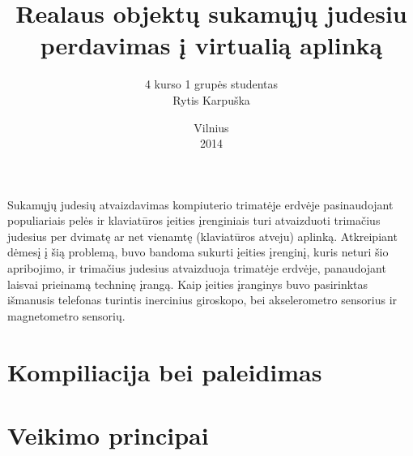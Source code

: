\documentclass[12pt, a4paper, lithuanian, final]{article}
\title{Realaus objektų sukamųjų judesiu perdavimas į virtualią aplinką}
\author{
    4 kurso 1 grupės studentas \\
    Rytis Karpuška
}
\date{Vilnius \\
	2014}
\begin{document}
\maketitle


Sukamųjų judesių atvaizdavimas kompiuterio trimatėje erdvėje pasinaudojant populiariais pelės ir klaviatūros įeities įrenginiais turi atvaizduoti trimačius judesius per dvimatę ar net vienamtę (klaviatūros atveju) aplinką.
Atkreipiant dėmesį į šią problemą, buvo bandoma sukurti įeities įrenginį, kuris neturi šio apribojimo, ir trimačius judesius atvaizduoja trimatėje erdvėje, panaudojant laisvai prieinamą techninę įrangą.
Kaip įeities įranginys buvo pasirinktas išmanusis telefonas turintis inercinius giroskopo, bei akselerometro sensorius ir magnetometro sensorių.


\section{Kompiliacija bei paleidimas}




\section{Veikimo principai}
\end{document}
